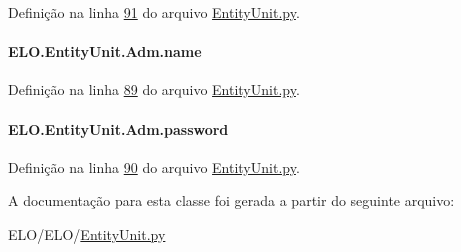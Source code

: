 Definição na linha \hyperlink{EntityUnit_8py_source_l00091}{91} do arquivo \hyperlink{EntityUnit_8py_source}{Entity\-Unit.\-py}.

\hypertarget{classELO_1_1EntityUnit_1_1Adm_a12f7aaf17dc6e036186e7757244cd12a}{
\paragraph[{name}]{\setlength{\rightskip}{0pt plus 5cm}E\-L\-O.\-Entity\-Unit.\-Adm.\-name}}\label{classELO_1_1EntityUnit_1_1Adm_a12f7aaf17dc6e036186e7757244cd12a}


Definição na linha \hyperlink{EntityUnit_8py_source_l00089}{89} do arquivo \hyperlink{EntityUnit_8py_source}{Entity\-Unit.\-py}.

\hypertarget{classELO_1_1EntityUnit_1_1Adm_aed97c3f4efa1320ef99b3794b51f8e5e}{
\paragraph[{password}]{\setlength{\rightskip}{0pt plus 5cm}E\-L\-O.\-Entity\-Unit.\-Adm.\-password}}\label{classELO_1_1EntityUnit_1_1Adm_aed97c3f4efa1320ef99b3794b51f8e5e}


Definição na linha \hyperlink{EntityUnit_8py_source_l00090}{90} do arquivo \hyperlink{EntityUnit_8py_source}{Entity\-Unit.\-py}.



A documentação para esta classe foi gerada a partir do seguinte arquivo\-:\begin{DoxyCompactItemize}
\item 
E\-L\-O/\-E\-L\-O/\hyperlink{EntityUnit_8py}{Entity\-Unit.\-py}\end{DoxyCompactItemize}
